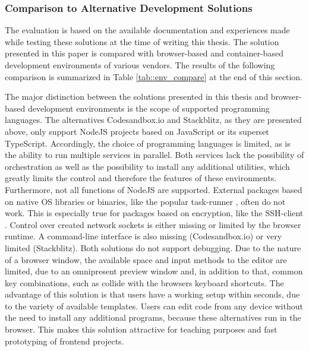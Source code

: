     \subsubsection{Comparison to Alternative Development Solutions}
    The evaluation is based on the available documentation and experiences made while testing these solutions at the time of writing this thesis. The solution presented in this paper is compared with browser-based and container-based development environments of various vendors. The results of the following comparison is summarized in Table \ref{tab::env_compare} at the end of this section.

        The major distinction between the solutions presented in this thesis and browser-based development environments is the scope of supported programming languages. The alternatives Codesandbox.io and Stackblitz, as they are presented above, only support NodeJS projects based on JavaScript or its superset TypeScript. Accordingly, the choice of programming languages is limited, as is the ability to run multiple services in parallel. Both services lack the possibility of orchestration as well as the possibility to install any additional utilities, which greatly limits the control and therefore the features of these environments. \newline
        Furthermore, not all functions of NodeJS are supported. External packages based on native \ac{OS} libraries or binaries, like the popular task-runner , often do not work. This is especially true for packages based on encryption, like the \ac{SSH}-client . Control over created network sockets is either missing or limited by the browser runtime. A command-line interface is also missing (Codesandbox.io) or very limited (Stackblitz). Both solutions do not support debugging. Due to the nature of a browser window, the available space and input methods to the editor are limited, due to an omnipresent preview window and, in addition to that, common key combinations, such as  collide with the browsers keyboard shortcuts.\newline
        The advantage of this solution is that users have a working setup within seconds, due to the variety of available templates. Users can edit code from any device without the need to install any additional programs, because these alternatives run in the browser. This makes this solution attractive for teaching purposes and fast prototyping of frontend projects.\newline
